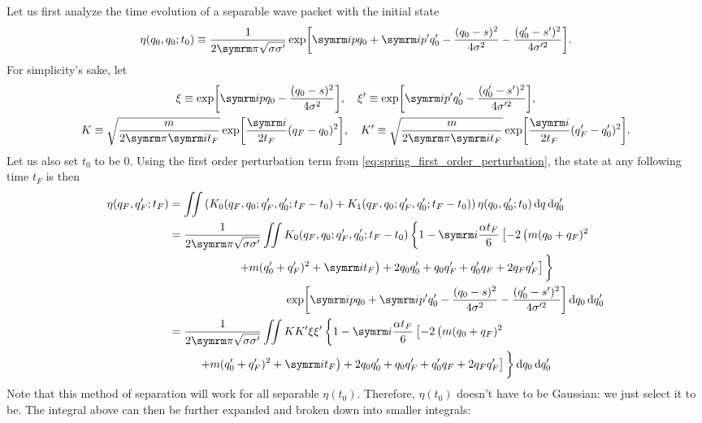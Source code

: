 Let us first analyze the time evolution of a separable wave packet with the initial state
\begin{equation}
    \eta(q_0, q_0; t_0) \equiv \frac{1}{2\cpi\sqrt{\sigma\sigma'}}\exp[\im pq_0 + \im p'q_0' - \frac{(q_0 - s)^2}{4\sigma^2} - \frac{(q_0' - s')^2}{4\sigma'^2}].
\end{equation}
For simplicity's sake, let
\begin{gather*}
    \xi \equiv \exp[\im pq_0 - \frac{(q_0 - s)^2}{4\sigma^2}], \quad \xi' \equiv \exp[\im p'q_0' - \frac{(q_0' - s')^2}{4\sigma'^2}], \\
    K \equiv \sqrt{\frac{m}{2\cpi\im t_F}}\exp[\frac{\im}{2t_F}(q_F - q_0)^2], \quad K' \equiv \sqrt{\frac{m}{2\cpi\im t_F}}\exp[\frac{\im}{2t_F}(q_F' - q_0')^2].
\end{gather*}
Let us also set $t_0$ to be $0$. Using the first order perturbation term from \cref{eq:spring_first_order_perturbation}, the state at any following time $t_F$ is then
\begin{align}
    \eta(q_F, q_F'; t_F) &= \iint\left(K_0(q_F, q_0; q_F', q_0'; t_F - t_0) + K_1(q_F, q_0; q_F', q_0'; t_F - t_0)\right)\eta(q_0, q_0'; t_0)\dd{q}\dd{q_0'} \\
    &= \begin{multlined}[t]
        \frac{1}{2\cpi\sqrt{\sigma\sigma'}}\iint K_0(q_F, q_0; q_F', q_0'; t_F - t_0)\left\{1 - \im\frac{\alpha t_F}{6}\left[-2\left(m(q_0 + q_F)^2 \right.\right.\right.\\
        \left.\left.\left. + m(q_0' + q_F')^2 + \im t_F\right) + 2q_0q_0' + q_0q_F' + q_0'q_F + 2q_Fq_F'\right]\vphantom{\frac{\alpha t_F}{6}}\right\}
        \\ \exp[\im pq_0 + \im p'q_0' - \frac{(q_0 - s)^2}{4\sigma^2} - \frac{(q_0' - s')^2}{4\sigma'^2}]\dd{q_0}\dd{q_0'}
    \end{multlined} \\
    &= \begin{multlined}[t]
        \frac{1}{2\cpi\sqrt{\sigma\sigma'}}\iint KK'\xi\xi'\left\{1 - \im\frac{\alpha t_F}{6}\left[-2\left(m(q_0 + q_F)^2 \right.\right.\right.\\
        \left.\left.\left. + m(q_0' + q_F')^2 + \im t_F\right) + 2q_0q_0' + q_0q_F' + q_0'q_F + 2q_Fq_F'\right]\vphantom{\frac{\alpha t_F}{6}}\right\} \dd{q_0}\dd{q_0'}
    \end{multlined}
\end{align}
Note that this method of separation will work for all separable $\eta(t_0)$. Therefore, $\eta(t_0)$ doesn't have to be Gaussian: we just select it to be. The integral above can then be further expanded and broken down into smaller integrals:
